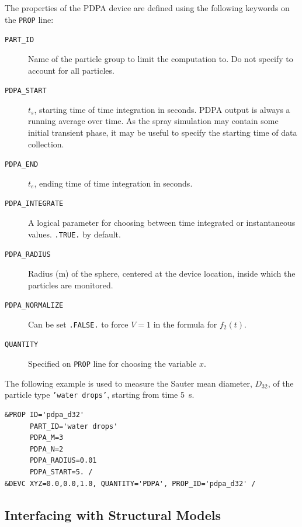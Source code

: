 \documentclass[11pt]{book}
\newcommand{\ct}{\tt\small}
\begin{document}
The properties of the PDPA device are defined using the following keywords on the {\ct PROP} line:
\begin{description}
\item[{\ct PART\_ID}] Name of the particle group to limit the computation to. Do not specify to account for all particles.
\item[{\ct PDPA\_START}] $t_s$, starting time of time integration in seconds. PDPA output is always a running average over time.
As the spray simulation may contain some initial transient phase, it may be useful to specify the starting time of data collection.
\item[{\ct PDPA\_END}] $t_e$, ending time of time integration in seconds.
\item[{\ct PDPA\_INTEGRATE}] A logical parameter for choosing between time integrated or instantaneous values. {\ct .TRUE.} by default.
\item[{\ct PDPA\_RADIUS}] Radius (m) of the sphere, centered at the device location, inside which the particles are monitored.
\item[{\ct PDPA\_NORMALIZE}] Can be set {\ct .FALSE.} to force $V = 1$ in the formula for $f_2(t)$.
\item[{\ct QUANTITY}] Specified on {\ct PROP} line for choosing the variable $x$.
\end{description}

\noindent The following example is used to measure the Sauter mean diameter, $D_{32}$, of the particle type {\ct 'water drops'}, starting from
time 5~s.
\footnotesize
\begin{verbatim}
&PROP ID='pdpa_d32'
      PART_ID='water drops'
      PDPA_M=3
      PDPA_N=2
      PDPA_RADIUS=0.01
      PDPA_START=5. /
&DEVC XYZ=0.0,0.0,1.0, QUANTITY='PDPA', PROP_ID='pdpa_d32' /
\end{verbatim}

\normalsize



\subsection{Interfacing with Structural Models}
\label{info:AST}
\end{document}
